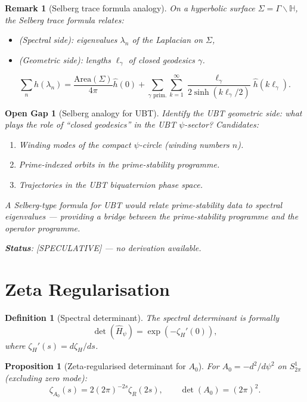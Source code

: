 \documentclass[11pt,a4paper]{article}
\newtheorem{proposition}{Proposition}
\newtheorem{definition}{Definition}
\newtheorem{remark}{Remark}
\newtheorem{gap}{Open Gap}
\begin{document}
\begin{remark}[Selberg trace formula analogy]
  On a hyperbolic surface $\Sigma = \Gamma\backslash\mathbb{H}$, the Selberg
  trace formula relates:
  \begin{itemize}
    \item (Spectral side): eigenvalues $\lambda_n$ of the Laplacian on $\Sigma$,
    \item (Geometric side): lengths $\ell_\gamma$ of closed geodesics $\gamma$.
  \end{itemize}
  \[
    \sum_n h(\lambda_n) = \frac{\mathrm{Area}(\Sigma)}{4\pi}\hat{h}(0)
    + \sum_{\gamma \text{ prim.}} \sum_{k=1}^\infty \frac{\ell_\gamma}{2\sinh(k\ell_\gamma/2)} \hat{h}(k\ell_\gamma).
  \]
\end{remark}

\begin{gap}[Selberg analogy for UBT]
  Identify the UBT geometric side: what plays the role of ``closed geodesics''
  in the UBT $\psi$-sector?  Candidates:
  \begin{enumerate}
    \item Winding modes of the compact $\psi$-circle (winding numbers $n$).
    \item Prime-indexed orbits in the prime-stability programme.
    \item Trajectories in the UBT biquaternion phase space.
  \end{enumerate}
  A Selberg-type formula for UBT would relate prime-stability data to
  spectral eigenvalues — providing a bridge between the prime-stability
  programme and the operator programme.

  \textbf{Status}: [SPECULATIVE] — no derivation available.
\end{gap}

\section{Zeta Regularisation}

\begin{definition}[Spectral determinant]
  The spectral determinant is formally
  \[
    \det(\hat{H}_\psi) = \exp\!\left(-\zeta_H'(0)\right),
  \]
  where $\zeta_H'(s) = d\zeta_H/ds$.
\end{definition}

\begin{proposition}[Zeta-regularised determinant for $A_0$]
  For $A_0 = -d^2/d\psi^2$ on $S^1_{2\pi}$ (excluding zero mode):
  \[
    \zeta_{A_0}(s) = 2(2\pi)^{-2s}\zeta_R(2s), \qquad
    \det(A_0) = (2\pi)^2.
  \]
\end{proposition}
\end{document}
